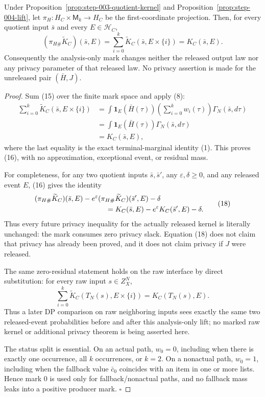 \begin{proposition}\label{prop:step-004-projection}
Under Proposition~\ref{prop:step-003-quotient-kernel} and
Proposition~\ref{prop:step-004-lift}, let
\(\pi_H:H_C\times\mathsf M_k\to H_C\) be the first-coordinate projection.
Then, for every quotient input \(\bar s\) and every
\(E\in\mathcal H_C\),
\[
(\pi_{H\#}\widetilde K_C)(\bar s,E)
=\sum_{i=0}^k
  \widetilde K_C(\bar s,E\times\{i\})
=K_C(\bar s,E).
\tag{16}
\]
Consequently the analysis-only mark changes neither the released output law
nor any privacy parameter of that released law. No privacy assertion is made
for the unreleased pair \((\bar H,J)\).


\end{proposition}

\begin{proof}
Sum (15) over the finite mark space and apply (8):
\[
\begin{aligned}
\sum_{i=0}^k
\widetilde K_C(\bar s,E\times\{i\})
&=\int
\mathbf1_E(\bar H(\tau))
\left(\sum_{i=0}^k w_i(\tau)\right)
\Gamma_N(\bar s,d\tau)\\
&=\int\mathbf1_E(\bar H(\tau))
\Gamma_N(\bar s,d\tau)\\
&=K_C(\bar s,E),
\end{aligned}
\tag{17}
\]
where the last equality is the exact terminal-marginal identity (1). This
proves (16), with no approximation, exceptional event, or residual mass.

For completeness, for any two quotient inputs \(\bar s,\bar s'\), any
\(\varepsilon,\delta\geq0\), and any released event \(E\), (16) gives the
identity
\[
\begin{aligned}
&(\pi_{H\#}\widetilde K_C)(\bar s,E)
-e^\varepsilon(\pi_{H\#}\widetilde K_C)(\bar s',E)-\delta\\
&\hspace{35mm}=
K_C(\bar s,E)-e^\varepsilon K_C(\bar s',E)-\delta.
\end{aligned}
\tag{18}
\]
Thus every future privacy inequality for the actually released kernel is
literally unchanged: the mark consumes zero privacy slack. Equation (18)
does not claim that privacy has already been proved, and it does not claim
privacy if \(J\) were released.

The same zero-residual statement holds on the raw interface by direct
substitution: for every raw input \(s\in Z_X^N\),
\[
\sum_{i=0}^k
\widetilde K_C(T_N(s),E\times\{i\})
=K_C(T_N(s),E).
\tag{19}
\]
Thus a later DP comparison on raw neighboring inputs sees exactly the same
two released-event probabilities before and after this analysis-only lift;
no marked raw kernel or additional privacy theorem is being asserted here.

The status split is essential. On an actual path, \(w_0=0\), including when
there is exactly one occurrence, all \(k\) occurrences, or \(k=2\). On a
nonactual path, \(w_0=1\), including when the fallback value \(\bar c_0\)
coincides with an item in one or more lists. Hence mark \(0\) is used only
for fallback/nonactual paths, and no fallback mass leaks into a positive
producer mark. \(\square\)


\end{proof}

